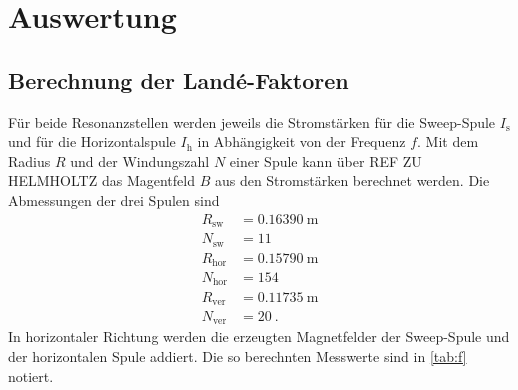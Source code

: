 \section{Auswertung}
\label{sec:Auswertung}

\subsection{Berechnung der Landé-Faktoren}
\label{ssec:lande}

Für beide Resonanzstellen werden jeweils die Stromstärken für die Sweep-Spule $I_\text{s}$ und für die Horizontalspule $I_\text{h}$ in Abhängigkeit von der Frequenz $f$.
Mit dem Radius $R$ und der Windungszahl $N$ einer Spule kann über REF ZU HELMHOLTZ das Magentfeld $B$ aus den Stromstärken berechnet werden.
Die Abmessungen der drei Spulen sind 
\begin{align*}
    R_\text{sw} &= \qty{0.16390}{\meter} \\
    N_\text{sw} &= \qty{11}{} \\
    R_\text{hor} &= \qty{0.15790}{\meter} \\
    N_\text{hor} &= \qty{154}{} \\
    R_\text{ver} &= \qty{0.11735}{\meter} \\
    N_\text{ver} &= \qty{20}{}.
\end{align*}
In horizontaler Richtung werden die erzeugten Magnetfelder der Sweep-Spule und der horizontalen Spule addiert.
Die so berechnten Messwerte sind in \autoref{tab:f} notiert.


